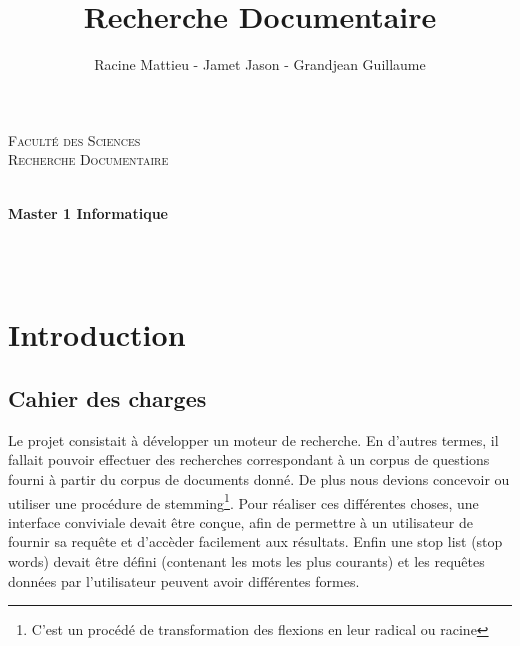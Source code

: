 \documentclass[11pt,a4paper]{article}
\title{Recherche Documentaire}
\author{Racine Mattieu - Jamet Jason - Grandjean Guillaume}
\date{}
\begin{document}
\makeatletter
  \begin{titlepage}
  \centering
      {\large \textsc{Faculté des Sciences}}\\
      \textsc{Recherche Documentaire}\\
    \vspace{1cm}
      
      \hfill
    \vspace{1cm}
      {\large\textbf{	\@date\\
       Master 1 Informatique}}\\
       \vspace{2cm}
       \hrulefill
    
    
       {\LARGE \textbf{\@title}} \\
    \vspace{2em}
        {\large \@author} \\
        \hrulefill
    \vspace{4cm}
    
    

    
        
  \end{titlepage}
\makeatother





\newpage
\tableofcontents

\newpage

\section{Introduction}
\subsection{Cahier des charges}
Le projet consistait à développer un moteur de recherche. En d'autres termes, il fallait pouvoir effectuer des recherches correspondant à un corpus de questions fourni à partir du corpus de documents donné.
De plus nous devions concevoir ou utiliser une procédure de stemming\footnote{C'est un procédé de transformation des flexions en leur radical ou racine}.
Pour réaliser ces différentes choses, une interface conviviale devait être conçue, afin de permettre à un utilisateur de fournir sa requête et d'accèder facilement aux résultats.
Enfin une stop list (stop words) devait être défini (contenant les mots les plus courants) et les requêtes données par l'utilisateur peuvent avoir différentes formes.
\end{document}
